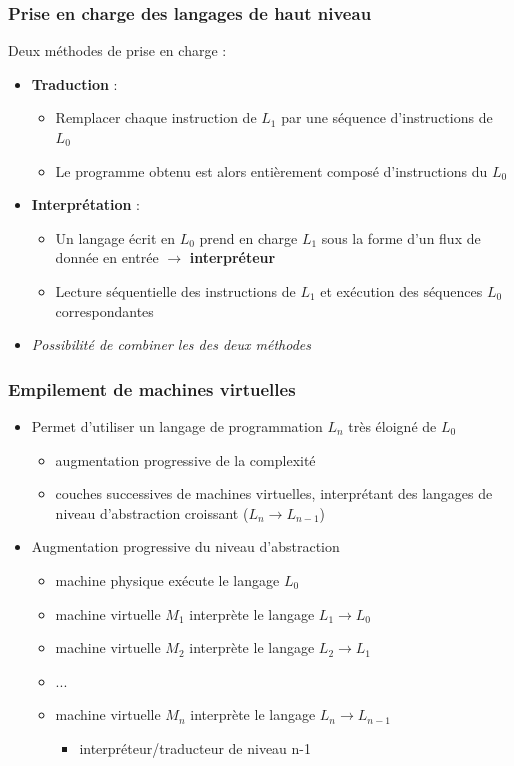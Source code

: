 \begin{frame}
\frametitle{Prise en charge des langages de haut niveau}
Deux méthodes de prise en charge :
\begin{itemize}
\item \textbf{Traduction} :
\begin{itemize}
\item Remplacer chaque instruction de $L_1$ par une séquence d'instructions de $L_0$
\item Le programme obtenu est alors entièrement composé d'instructions du $L_0$
\end{itemize}

\item \textbf{Interprétation} :
\begin{itemize}
\item Un langage écrit en $L_0$ prend en charge $L_1$ sous la forme d'un flux de donnée en entrée $\rightarrow$ \textbf{interpréteur}
\item Lecture séquentielle des instructions de $L_1$ et exécution des séquences $L_0$ correspondantes
\end{itemize}
\item \textit{Possibilité de combiner les des deux méthodes} \cite{tanen}
\end{itemize}
\end{frame}

\begin{frame}
\frametitle{Empilement de machines virtuelles}
\begin{itemize}
\item Permet d'utiliser un langage de programmation $L_n$ très éloigné de $L_0$
\begin{itemize}
\item augmentation progressive de la complexité
\item couches successives de machines virtuelles, interprétant des langages de niveau d'abstraction croissant ($L_n \rightarrow L_{n-1}$)
\end{itemize}

\item Augmentation progressive du niveau d'abstraction
\begin{itemize}
\item machine physique exécute le langage $L_0$
\item machine virtuelle $M_1$ interprète le langage $L_1 \rightarrow L_0$
\item machine virtuelle $M_2$ interprète le langage $L_2 \rightarrow L_1$
\item ...
\item machine virtuelle $M_n$ interprète le langage $L_n \rightarrow L_{n-1}$
\begin{itemize}
\item interpréteur/traducteur de niveau n-1
\end{itemize}
\end{itemize}
\end{itemize}
\end{frame}


